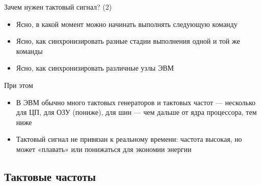 \documentclass[xetex,aspectratio=43]{beamer}
\begin{document}
\begin{frame}{Зачем нужен тактовый сигнал? (2)}
    \begin{itemize}
        \tightlist
        \item
        Ясно, в какой момент можно начинать выполнять следующую команду
        \item
        Ясно, как синхронизировать разные стадии выполнения одной и той же
        команды
        \item
        Ясно, как синхронизировать различные узлы ЭВМ
    \end{itemize}

    При этом

    \begin{itemize}
        \tightlist
        \item
        В ЭВМ обычно много тактовых генераторов и тактовых частот ---
        несколько для ЦП, для ОЗУ (пониже), для шин --- чем дальше
        от ядра процессора, тем ниже
        \item
        Тактовый сигнал не привязан к реальному времени: частота высокая, но
        может «плавать» или понижаться для экономии энергии
    \end{itemize}
\end{frame}

\subsection{Тактовые частоты}
\end{document}
